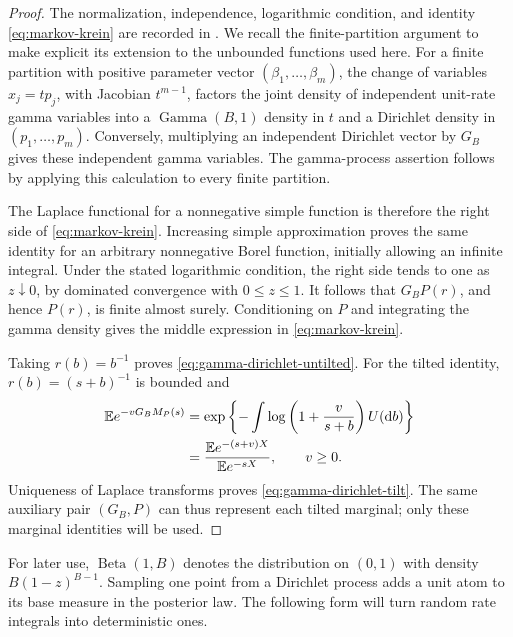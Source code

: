 \begin{proof}
The normalization, independence, logarithmic condition, and identity \eqref{eq:markov-krein} are recorded in \cite[Section~1, reprint p.~2, equations~(1)--(3)]{James2005}.
We recall the finite-partition argument to make explicit its extension to the unbounded functions used here.
For a finite partition with positive parameter vector \((\beta_1,\ldots,\beta_m)\), the change of variables \(x_j=tp_j\), with Jacobian \(t^{m-1}\), factors the joint density of independent unit-rate gamma variables into a \(\operatorname{Gamma}(B,1)\) density in \(t\) and a Dirichlet density in \((p_1,\ldots,p_m)\).
Conversely, multiplying an independent Dirichlet vector by \(G_B\) gives these independent gamma variables.
The gamma-process assertion follows by applying this calculation to every finite partition.

The Laplace functional for a nonnegative simple function is therefore the right side of \eqref{eq:markov-krein}.
Increasing simple approximation proves the same identity for an arbitrary nonnegative Borel function, initially allowing an infinite integral.
Under the stated logarithmic condition, the right side tends to one as \(z\downarrow0\), by dominated convergence with \(0\le z\le1\).
It follows that \(G_BP(r)\), and hence \(P(r)\), is finite almost surely.
Conditioning on \(P\) and integrating the gamma density gives the middle expression in \eqref{eq:markov-krein}.

Taking \(r(b)=b^{-1}\) proves \eqref{eq:gamma-dirichlet-untilted}.
For the tilted identity, \(r(b)=(s+b)^{-1}\) is bounded and
\begin{align*}
  \mathbb E e^{-vG_BM_P(s)}
  &=\exp\left\{-\int
       \log\left(1+\frac{v}{s+b}\right)U(\mathop{}\!\mathrm d b)\right\}\\
  &=\frac{\mathbb E e^{-(s+v)X}}{\mathbb E e^{-sX}},\qquad v\ge0.
\end{align*}
Uniqueness of Laplace transforms proves \eqref{eq:gamma-dirichlet-tilt}.
The same auxiliary pair \((G_B,P)\) can thus represent each tilted marginal; only these marginal identities will be used.
\end{proof}

For later use, \(\operatorname{Beta}(1,B)\) denotes the distribution on \((0,1)\) with density \(B(1-z)^{B-1}\).
Sampling one point from a Dirichlet process adds a unit atom to its base measure in the posterior law.
The following form will turn random rate integrals into deterministic ones.

